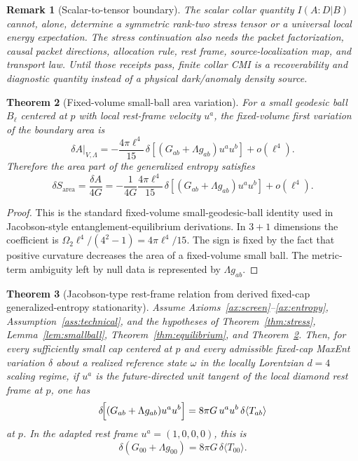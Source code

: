\documentclass[11pt]{article}
\newtheorem{theorem}{Theorem}[section]
\newtheorem{remark}[theorem]{Remark}
\begin{document}
\begin{remark}[Scalar-to-tensor boundary]
The scalar collar quantity \(I(A:D|B)\) cannot, alone, determine a symmetric
rank-two stress tensor or a universal local energy expectation.  The stress
continuation also needs the packet factorization, causal packet directions,
allocation rule, rest frame, source-localization map, and transport law.  Until
those receipts pass, finite collar CMI is a recoverability and diagnostic
quantity instead of a physical dark/anomaly density source.
\end{remark}

\begin{theorem}[Fixed-volume small-ball area variation]\label{thm:fixed-volume-small-ball-area}
For a small geodesic ball \(B_\ell\) centered at \(p\) with local rest-frame
velocity \(u^a\), the fixed-volume first variation of the boundary area is
\[
\delta A\big|_{V,\Lambda}
=
-\frac{4\pi\ell^4}{15}\,
\delta\!\left[(G_{ab}+\Lambda g_{ab})u^a u^b\right]
+o(\ell^4).
\]
Therefore the area part of the generalized entropy satisfies
\[
\delta S_{\mathrm{area}}
=
\frac{\delta A}{4G}
=
-\frac{1}{4G}\frac{4\pi\ell^4}{15}\,
\delta\!\left[(G_{ab}+\Lambda g_{ab})u^a u^b\right]
+o(\ell^4).
\]
\end{theorem}

\begin{proof}
This is the standard fixed-volume small-geodesic-ball identity used in
Jacobson-style entanglement-equilibrium derivations. In \(3+1\) dimensions the
coefficient is \(\Omega_2\ell^4/(4^2-1)=4\pi\ell^4/15\). The sign is fixed by
the fact that positive curvature decreases the area of a fixed-volume small
ball. The metric-term ambiguity left by null data is represented by
\(\Lambda g_{ab}\).
\end{proof}

\begin{theorem}[Jacobson-type rest-frame relation from derived fixed-cap generalized-entropy stationarity]\label{thm:einstein}
Assume Axioms~\ref{ax:screen}--\ref{ax:entropy}, Assumption~\ref{ass:technical}, and the hypotheses of Theorem~\ref{thm:stress}, Lemma~\ref{lem:smallball}, Theorem~\ref{thm:equilibrium}, and Theorem~\ref{thm:fixed-volume-small-ball-area}. Then, for every sufficiently small cap centered at $p$ and every admissible fixed-cap MaxEnt variation $\delta$ about a realized reference state $\omega$ in the locally Lorentzian $d=4$ scaling regime, if $u^a$ is the future-directed unit tangent of the local diamond rest frame at $p$, one has
\[
\delta\!\Bigl[(G_{ab}+\Lambda g_{ab})u^a u^b\Bigr]
=
8\pi G\,u^a u^b\,\delta\langle T_{ab}\rangle
\]
at $p$. In the adapted rest frame $u^a=(1,0,0,0)$, this is
\[
\delta\!\left(G_{00}+\Lambda g_{00}\right)=8\pi G\,\delta\langle T_{00}\rangle.
\]
\end{theorem}
\end{document}
